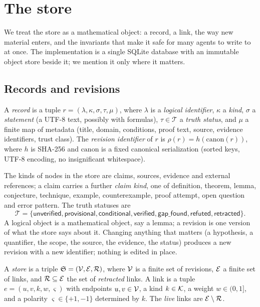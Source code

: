 \section{The store}\label{sec:store}

We treat the store as a mathematical object: a record, a link, the way new material enters, and the invariants that make it safe for many agents to write to at once. The implementation is a single SQLite database with an immutable object store beside it; we mention it only where it matters.

\subsection{Records and revisions}

\begin{definition}[Record]\label{def:record}
A \emph{record} is a tuple $r=(\lambda,\kappa,\sigma,\tau,\mu)$, where $\lambda$ is a \emph{logical identifier}, $\kappa$ a \emph{kind}, $\sigma$ a \emph{statement} (a UTF-8 text, possibly with formulas), $\tau\in\mathcal{T}$ a \emph{truth status}, and $\mu$ a finite map of metadata (title, domain, conditions, proof text, source, evidence identifiers, trust class). The \emph{revision identifier} of $r$ is $\rho(r)=h(\mathrm{canon}(r))$, where $h$ is SHA-256 and $\mathrm{canon}$ is a fixed canonical serialization (sorted keys, UTF-8 encoding, no insignificant whitespace).
\end{definition}

The kinds of nodes in the store are claims, sources, evidence and external references; a claim carries a further \emph{claim kind}, one of definition, theorem, lemma, conjecture, technique, example, counterexample, proof attempt, open question and error pattern. The truth statuses are
\[
\mathcal{T}=\{\textsf{unverified},\textsf{provisional},\textsf{conditional},\textsf{verified},\textsf{gap\_found},\textsf{refuted},\textsf{retracted}\}.
\]
A logical object is a mathematical object, say a lemma; a revision is one version of what the store says about it. Changing anything that matters (a hypothesis, a quantifier, the scope, the source, the evidence, the status) produces a new revision with a new identifier; nothing is edited in place.

\begin{definition}[Store]\label{def:store}
A \emph{store} is a triple $\mathfrak{S}=(\mathcal{V},\mathcal{E},\mathcal{R})$, where $\mathcal{V}$ is a finite set of revisions, $\mathcal{E}$ a finite set of links, and $\mathcal{R}\subseteq\mathcal{E}$ the set of \emph{retracted} links. A link is a tuple $e=(u,v,k,w,\varsigma)$ with endpoints $u,v\in\mathcal{V}$, a kind $k\in\mathcal{K}$, a weight $w\in(0,1]$, and a polarity $\varsigma\in\{+1,-1\}$ determined by $k$. The \emph{live} links are $\mathcal{E}\setminus\mathcal{R}$.
\end{definition}

